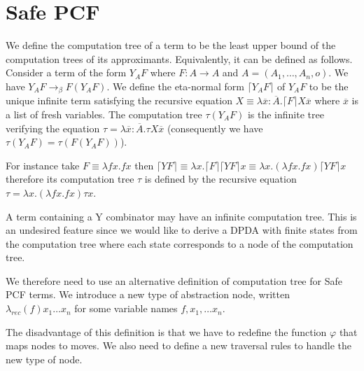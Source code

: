 \documentclass{article}
\newcommand{\aux}[1]{\lceil #1\rceil}
\newcommand{\betared}{\rightarrow_\beta}
\newcommand{\syneq}{\equiv}
\begin{document}
\section{Safe PCF}

We define the computation tree of a term to be the least upper bound of the computation trees of its approximants. Equivalently, it can be defined as follows. Consider a term of the form $Y_A F$ where $F:A\rightarrow A$ and $A = (A_1,\ldots,A_n,o)$.
We have $Y_A F \betared F (Y_A F)$.
We define the eta-normal form $\aux{Y_A F}$ of $Y_A F$ to be the unique infinite term satisfying the recursive equation $X \syneq \lambda \overline{x}: \overline{A} . \aux{F} X \overline{x}$
where $\overline{x}$ is a list of fresh variables.
The computation tree $\tau(Y_A F)$ is the infinite tree verifying the equation 
$\tau =  \lambda \overline{x}: \overline{A} . \tau X \overline{x}$ (consequently we have $\tau(Y_A F) = \tau(F (Y_A F))$).

For instance take $F \syneq \lambda f x. f x$ then 
$\aux{Y F} \syneq \lambda x . \aux{F} \aux{Y F} x \syneq \lambda x. (\lambda f x. f x) \aux{Y F} x$ therefore its computation tree $\tau$ is defined by the recursive equation $\tau = \lambda x . (\lambda f x. f x)  \tau x$.


A term containing a Y combinator may have an infinite computation tree. This is an undesired feature since we would like to derive a DPDA with finite states from the computation tree where each state corresponds to a node of the computation tree.


We therefore need to use an alternative definition of computation tree for Safe PCF terms.  We introduce a new type of abstraction node, written $\lambda_{rec}(f) x_1 \ldots x_n$ for some variable names $f, x_1, \ldots x_n$.




The disadvantage of this definition is that we have to redefine the function $\varphi$ that maps nodes to moves. We also need to define a new traversal rules to handle the new type of node.
\end{document}
